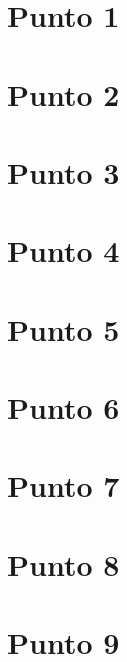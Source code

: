 \documentclass{article}
\begin{document}
\section*{Punto 1}


\pagebreak

\section*{Punto 2}


\pagebreak

\section*{Punto 3}


\pagebreak

\section*{Punto 4}


\pagebreak

\section*{Punto 5}


\pagebreak

\section*{Punto 6}


\pagebreak

\section*{Punto 7}


\pagebreak

\section*{Punto 8}


\pagebreak

\section*{Punto 9}

\end{document}
